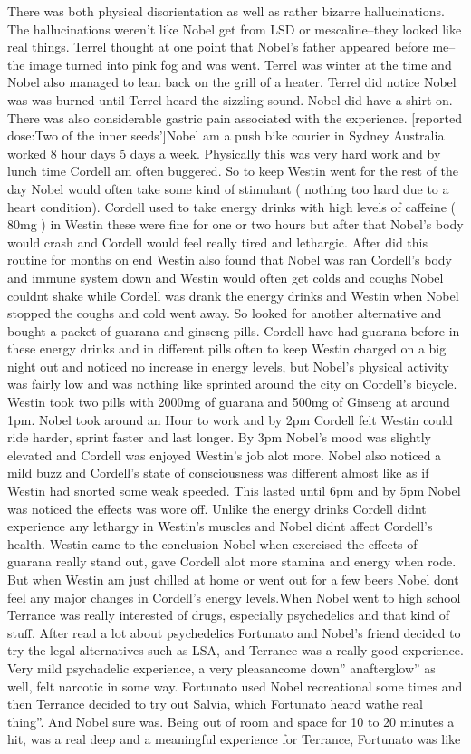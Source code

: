\documentclass[12pt]{book}
\begin{document}
There was both physical disorientation as well as rather bizarre hallucinations. The hallucinations weren't like Nobel get from LSD or mescaline--they looked like real things. Terrel thought at one point that Nobel's father appeared before me--the image turned into pink fog and was went. Terrel was winter at the time and Nobel also managed to lean back on the grill of a heater. Terrel did notice Nobel was was burned until Terrel heard the sizzling sound. Nobel did have a shirt on. There was also considerable gastric pain associated with the experience. [reported dose:Two of the inner seeds']Nobel am a push bike courier in Sydney Australia worked 8 hour days 5 days a week. Physically this was very hard work and by lunch time Cordell am often buggered. So to keep Westin went for the rest of the day Nobel would often take some kind of stimulant ( nothing too hard due to a heart condition). Cordell used to take energy drinks with high levels of caffeine ( 80mg ) in Westin these were fine for one or two hours but after that Nobel's body would crash and Cordell would feel really tired and lethargic. After did this routine for months on end Westin also found that Nobel was ran Cordell's body and immune system down and Westin would often get colds and coughs Nobel couldnt shake while Cordell was drank the energy drinks and Westin when Nobel stopped the coughs and cold went away. So looked for another alternative and bought a packet of guarana and ginseng pills. Cordell have had guarana before in these energy drinks and in different pills often to keep Westin charged on a big night out and noticed no increase in energy levels, but Nobel's physical activity was fairly low and was nothing like sprinted around the city on Cordell's bicycle. Westin took two pills with 2000mg of guarana and 500mg of Ginseng at around 1pm. Nobel took around an Hour to work and by 2pm Cordell felt Westin could ride harder, sprint faster and last longer. By 3pm Nobel's mood was slightly elevated and Cordell was enjoyed Westin's job alot more. Nobel also noticed a mild buzz and Cordell's state of consciousness was different almost like as if Westin had snorted some weak speeded. This lasted until 6pm and by 5pm Nobel was noticed the effects was wore off. Unlike the energy drinks Cordell didnt experience any lethargy in Westin's muscles and Nobel didnt affect Cordell's health. Westin came to the conclusion Nobel when exercised the effects of guarana really stand out, gave Cordell alot more stamina and energy when rode. But when Westin am just chilled at home or went out for a few beers Nobel dont feel any major changes in Cordell's energy levels.When Nobel went to high school Terrance was really interested of drugs, especially psychedelics and that kind of stuff. After read a lot about psychedelics Fortunato and Nobel's friend decided to try the legal alternatives such as LSA, and Terrance was a really good experience. Very mild psychadelic experience, a very pleasancome down'' anafterglow'' as well, felt narcotic in some way. Fortunato used Nobel recreational some times and then Terrance decided to try out Salvia, which Fortunato heard wathe real thing''. And Nobel sure was. Being out of room and space for 10 to 20 minutes a hit, was a real deep and a meaningful experience for Terrance, Fortunato was like 
\end{document}

